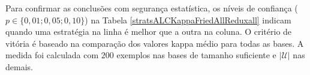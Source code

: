 Para confirmar as conclusões com segurança estatística, os níveis de confiança
($p \in \{0,01; 0,05; 0,10\}$) na Tabela \ref{stratsALCKappaFriedAllReduxall} indicam
quando uma estratégia na linha é melhor que a outra na coluna.
O critério de vitória é baseado na comparação dos valores kappa médio para todas as bases.
A medida foi calculada com $200$ exemplos nas bases de tamanho suficiente
e $|\mathcal{U}|$ nas demais.
% 
\begin{table}[h]
\caption{Um contra um para as estratégias (564 testes).
Medida: kappa médio. \textit{Legenda na Tabela \ref{tab:friedClassif}.}}

\begin{center}
\quad
{}
\end{center}
\end{table}
